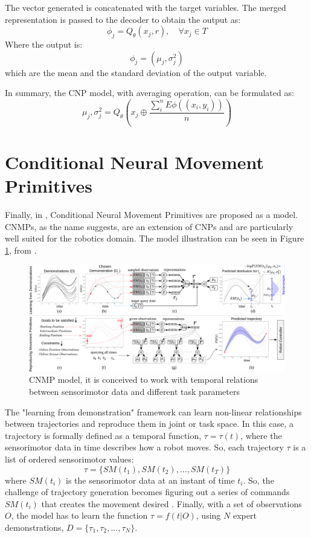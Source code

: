 The vector generated is concatenated with the target variables. The merged representation is passed to the decoder to obtain the output as:
\begin{equation}
    \phi_j = Q_\theta(x_j, r), \quad \forall x_j \in T
\end{equation}
Where the output is: 
\begin{equation}
    \phi_j = (\mu_j, \sigma_j^2)
\end{equation}
which are the mean and the standard deviation of the output variable.

In summary, the CNP model, with averaging operation, can be formulated as: 
\begin{equation}
    \mu_j, \sigma_j^2 = Q_\theta \left( x_j \oplus \frac{ \sum_{i}^{n} E\phi((x_i,y_i)) }{n}  \right)
\end{equation}

\section{Conditional Neural Movement Primitives}
Finally, in \cite{Ugur-RSS-19}, Conditional Neural Movement Primitives are proposed as a model. CNMPs, as the name suggests, are an extension of CNPs and are particularly well suited for the robotics domain. The model illustration can be seen in Figure \ref{fig:cnmp}, from \cite{Ugur-RSS-19}.  
\begin{figure}
	\centering
	\includegraphics[width=0.99\linewidth]{Images/CNMP.png}
	\caption{CNMP model, it is conceived to work with temporal relations between sensorimotor data and different task parameters}
	\label{fig:cnmp}
\end{figure}
The "learning from demonstration" framework can learn non-linear relationships between trajectories and reproduce them in joint or task space. In this case, a trajectory is formally defined as a temporal function, $\tau = \tau (t)$, where the sensorimotor data in time describes how a robot moves. So, each trajectory $\tau$ is a list of ordered sensorimotor values: 
\begin{equation}
    \tau = \{ SM(t_1), SM(t_2), ... , SM(t_T ) \}
\end{equation}
where $SM(t_i)$ is the sensorimotor data at an instant of time $t_i$.
So, the challenge of trajectory generation becomes figuring out a series of commands $SM(t_i)$ that creates the movement desired \cite{gasparetto2007new}. 
Finally, with a set of observations $O$, the model has to learn the function $\tau = f(t|O)$, using $N$ expert demonstrations, $D = \{\tau_1, \tau_2, ... , \tau_N \}$. 

